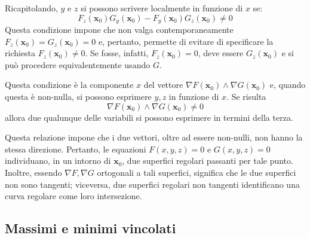 \documentclass[11pt, a4paper]{scrartcl}
\theoremstyle{definition}
\numberwithin{esempio}{section}
\theoremstyle{definition}
\numberwithin{obs}{section}
\numberwithin{nota}{section}
\numberwithin{equation}{subsection}
\begin{document}
Ricapitolando, $y$ e $z$ si possono scrivere localmente in funzione di $x$ se:
\begin{equation}
	F_z(\mathbf{x} _0) G_y(\mathbf{x} _0) - F_y(\mathbf{x} _0) G_z(\mathbf{x} _0) \neq 0
\end{equation}
Questa condizione impone che non valga contemporaneamente $F_z(\mathbf{x} _0) = G_z(\mathbf{x} _0) = 0$ e, pertanto, permette di evitare di specificare la richiesta $F_z(\mathbf{x} _0)\neq 0$.
Se fosse, infatti, $F_z (\mathbf{x} _0) = 0$, deve essere $G_z(\mathbf{x} _0)$ e si pu\`o procedere equivalentemente usando $G$.

Questa condizione \`e la componente $x$ del vettore $\nabla F(\mathbf{x} _0) \wedge \nabla G(\mathbf{x} _0)$ e, quando questa \`e non-nulla, si possono esprimere $y,z$ in funzione di $x$.
Se risulta 
\begin{equation}
	\nabla F(\mathbf{x} _0) \wedge \nabla G(\mathbf{x} _0) \neq 0
\end{equation}
allora due qualunque delle variabili si possono esprimere in termini della terza.

Questa relazione impone che i due vettori, oltre ad essere non-nulli, non hanno la stessa direzione. 
Pertanto, le equazioni $F(x,y,z) = 0$ e $G(x,y,z) = 0$ individuano, in un intorno di $\mathbf{x} _0$, due superfici regolari passanti per tale punto.
Inoltre, essendo $\nabla F, \nabla G$ ortogonali a tali superfici, significa che le due superfici non sono tangenti; viceversa, due superfici regolari non tangenti identificano una curva regolare come loro intersezione.

\subsection{Massimi e minimi vincolati}
\end{document}
